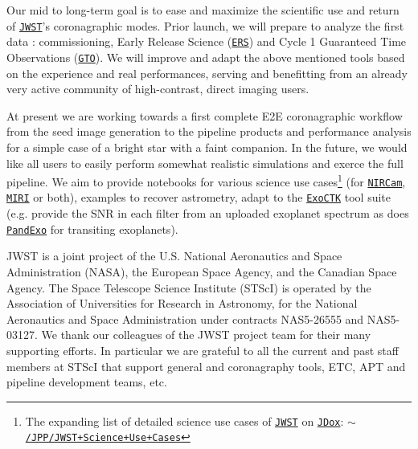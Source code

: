\documentclass[]{spie}  %
\newcommand{\todo}[1]{\textcolor{red}{[#1]}}
\newcommand{\jwst}{{\tt \href{https://jwst.stsci.edu}{JWST}}\xspace}
\newcommand{\nircam}{{\tt \href{https://jwst.stsci.edu/instrumentation/nircam}{NIRCam}}\xspace}
\newcommand{\miri}{{\tt \href{https://jwst.stsci.edu/instrumentation/miri}{MIRI}}\xspace}
\newcommand{\exoctk}{{\tt \href{https://exoctk.stsci.edu/}{ExoCTK}}\xspace}
\newcommand{\pandexo}{{\tt \href{https://exoctk.stsci.edu/pandexo/}{PandExo}}\xspace}
\newcommand{\jdox}{{\tt \href{https://jwst-docs.stsci.edu/}{JDox}}\xspace}
\newcommand{\ers}{{\tt \href{https://jwst.stsci.edu/observing-programs/approved-ers-programs}{ERS}}\xspace}%
\newcommand{\gto}{{\tt \href{https://jwst.stsci.edu/observing-programs/approved-gto-programs}{GTO}}\xspace}%
\begin{document}
Our mid to long-term goal is to ease and maximize the scientific use and return of \jwst's coronagraphic modes. Prior launch, we will prepare to analyze the first data : commissioning, Early Release Science (\ers) and Cycle 1 Guaranteed Time Observations (\gto). We will improve and adapt the above mentioned tools based on the experience and real performances, serving and benefitting from an already very active community of high-contrast, direct imaging users.

At present we are working towards a first complete E2E coronagraphic workflow from the seed image generation to the pipeline products and performance analysis for a simple case of a bright star with a faint companion. In the future, we would like all users to easily perform somewhat realistic simulations and exerce the full pipeline. We aim to provide notebooks for various science use cases\footnote{The expanding list of detailed science use cases of \jwst on \jdox: {\small \tt \href{https://jwst-docs.stsci.edu/display/JPP/JWST+Science+Use+Cases}{$\sim$/JPP/JWST+Science+Use+Cases}}} (for \nircam, \miri or both), examples to recover astrometry, adapt to the \exoctk\cite{stevenson2018_exoctk} tool suite (e.g. provide the SNR in each filter from an uploaded exoplanet spectrum as does \pandexo\cite{batalha2017_pandexo} for transiting exoplanets).

\acknowledgments %
 
JWST is a joint project of the U.S. National Aeronautics and Space Administration (NASA), the European Space Agency, and the Canadian Space Agency. The Space Telescope Science Institute (STScI) is operated by the Association of Universities for Research in Astronomy, for the National Aeronautics and Space Administration under contracts NAS5-26555 and NAS5-03127. We thank our colleagues of the JWST project team for their many supporting efforts. In particular we are grateful to all the current and past staff members at STScI that support general and coronagraphy tools, ETC, APT and pipeline development teams, etc.

\end{document}
